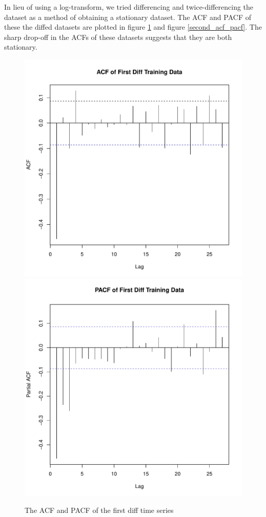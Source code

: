 \documentclass[11pt]{paper}
\begin{document}
In lieu of using a log-transform, we tried differencing and twice-differencing the dataset as a method of obtaining a stationary dataset. The ACF and PACF of these the diffed datasets are plotted in figure \ref{first_acf_pacf} and figure \ref{second_acf_pacf}. The sharp drop-off in the ACFs of these datasets suggests that they are both stationary.

\begin{figure}
\centering
\includegraphics[width=0.45\linewidth]{../image/acf_first_diff.pdf}
\includegraphics[width=0.45\linewidth]{../image/pacf_first_diff.pdf}
\caption{The ACF and PACF of the first diff time series}
\label{first_acf_pacf}
\end{figure}
\end{document}
